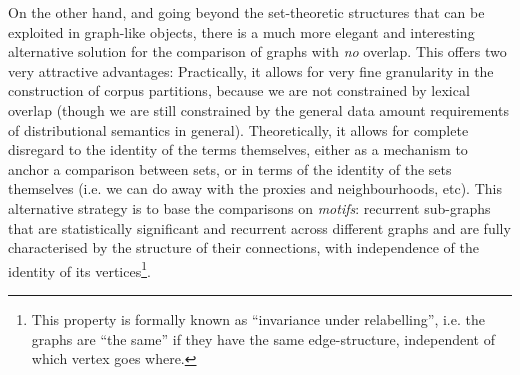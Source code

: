 On the other hand, and going beyond the set-theoretic structures that can be exploited in graph-like objects, there is a much more elegant and interesting alternative solution for the comparison of graphs with \emph{no} overlap.
This offers two very attractive advantages:
Practically, it allows for very fine granularity in the construction of corpus partitions, because we are not constrained by lexical overlap (though we are still constrained by the general data amount requirements of distributional semantics in general).
Theoretically, it allows for complete disregard to the identity of the terms themselves, either as a mechanism to anchor a comparison between sets, or in terms of the identity of the sets themselves (i.e. we can do away with the proxies and neighbourhoods, etc).
This alternative strategy is to base the comparisons on \emph{motifs}: recurrent sub-graphs that are statistically significant and recurrent across different graphs and are fully characterised by the structure of their connections, with independence of the identity of its vertices\footnote{
    This property is formally known as ``invariance under relabelling'', i.e. the graphs are ``the same'' if they have the same edge-structure, independent of which vertex goes where.
}.

